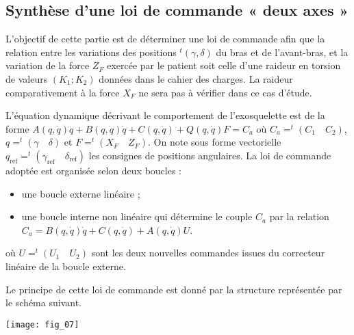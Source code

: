 \subsection*{Synthèse d’une loi de commande « deux axes »}

\begin{obj}
L’objectif de cette partie est de déterminer une loi de commande afin que la relation entre les variations
des positions $ ^t\left(\gamma,\delta\right)$ du bras et de l’avant-bras, et la variation de la force $Z_F$ exercée par le patient soit celle d’une raideur en torsion de valeurs $(K_1;K_2)$ données dans le cahier des charges. La raideur comparativement à la force $X_F$ ne sera pas à vérifier dans ce cas d’étude.
\end{obj}


L’équation dynamique décrivant le comportement de l’exosquelette est de la forme 
$A(q, \dot{q})\ddot{q}+ B(q, \dot{q})\dot{q} + C(q, \dot{q}) + Q(q, \dot{q}) F = C_a$ 
où $C_a = ^t(C_1\quad C_2)$, $q = ^t(\gamma \quad \delta)$ et $F = ^t(X_F \quad Z_F )$. On note sous forme vectorielle $q_{\text{ref}} = ^t(\gamma_{\text{ref}} \quad \delta_{\text{ref}})$ les consignes
de positions angulaires. La loi de commande adoptée est organisée selon deux boucles :
\begin{itemize}
\item une boucle externe linéaire ;
\item une boucle interne non linéaire qui détermine le couple $C_a$ par la relation
$C_a = B(q, \dot{q})\dot{q} + C(q, \dot{q}) + A(q, \dot{q}) U$.
\end{itemize}
où $U = ^t(U_1 \quad U_2)$ sont les deux nouvelles commandes issues du correcteur linéaire de la boucle externe.

Le principe de cette loi de commande est donné par la structure représentée par le schéma suivant.

\begin{marginfigure}
\texttt{[image: fig\_07]}
\end{marginfigure}


